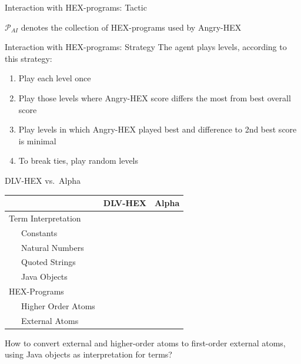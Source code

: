 \documentclass[smaller,dvipsnames]{beamer}
\newcommand{\ah}{Angry-HEX\xspace}
\newcommand{\al}{Alpha\xspace}
\begin{document}
\begin{frame}{Interaction with HEX-programs: Tactic}
	\begin{center}
\end{center}
\(\mathcal{P}_{AI}\) denotes the collection of HEX-programs used by \ah
\end{frame}

\begin{frame}{Interaction with HEX-programs: Strategy}
	The agent plays levels, according to this \alert{strategy}:
	\begin{enumerate}
		\item Play each level once
		\item Play those levels where \ah score differs the most from best overall score
		\item Play levels in which \ah played best and difference to 2nd best score is minimal
		\item To break ties, play random levels
	\end{enumerate}
\end{frame}

\begin{frame}{DLV-HEX vs.\ \al}
	\begin{center}
		\begin{tabular}{lcc}
			\toprule
			& \textbf{DLV-HEX} & \textbf{\al} \\
			\midrule
			\alert{Term Interpretation} & & \\
			~~~Constants & \checkmark & \checkmark \\
			~~~Natural Numbers & \checkmark & \checkmark \\
			~~~Quoted Strings & \checkmark & \checkmark \\
			~~~Java Objects & & \checkmark \\
			\midrule
			\alert{HEX-Programs} & & \\
			~~~Higher Order Atoms & \checkmark & \\
			~~~External Atoms & \checkmark & \checkmark \\
			\bottomrule
		\end{tabular}
	\end{center}
	How to \alert{convert} external and higher-order atoms to first-order external atoms, using Java objects as interpretation for terms?
\end{frame}
\end{document}
